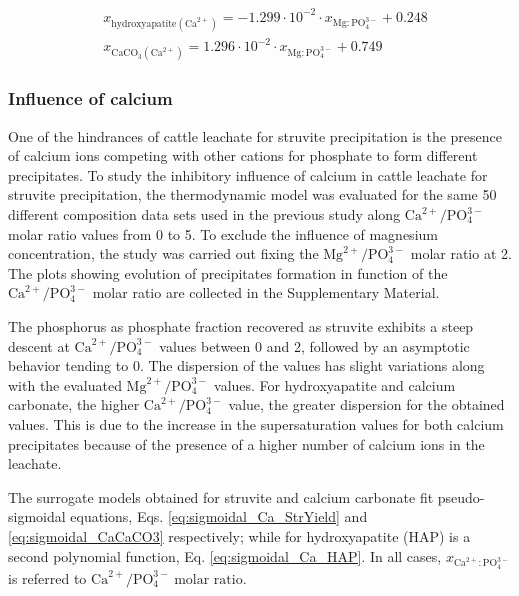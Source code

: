 \documentclass[10pt,a4paper]{article}
\begin{document}
\begin{align}
& x_{\text{hydroxyapatite} \left(\text{Ca}^{2+}\right)} = -1.299 \cdot 10^{-2} \cdot x_{\text{Mg}:\text{PO}_{4}^{3-}} + 0.248 \label{eq:1poly_Mg_CaCO3}\\
& x_{\text{CaCO}_{3} \left(\text{Ca}^{2+}\right)} = 1.296 \cdot 10^{-2} \cdot x_{\text{Mg}:\text{PO}_{4}^{3-}} + 0.749 \label{eq:1poly_Mg_HAP} 
\end{align}

\subsubsection{Influence of calcium}
One of the hindrances of cattle leachate for struvite precipitation is the presence of calcium ions competing with other cations for phosphate to form different precipitates.
To study the inhibitory influence of calcium in cattle leachate for struvite precipitation, the thermodynamic model was evaluated for the same 50 different composition data sets used in the previous study along $\text{Ca}^{2+}/\text{PO}_{4}^{3-}$ molar ratio values from 0 to 5. To exclude the influence of magnesium concentration, the study was carried out fixing the $\text{Mg}^{2+}/\text{PO}_{4}^{3-}$ molar ratio at 2.
The plots showing evolution of precipitates formation in function of the $\text{Ca}^{2+}/\text{PO}_{4}^{3-}$ molar ratio are collected in the Supplementary Material. 

The phosphorus as phosphate fraction recovered as struvite exhibits a steep descent at $\text{Ca}^{2+}/\text{PO}_{4}^{3-}$ values between 0 and 2, followed by an asymptotic behavior tending to 0. The dispersion of the values has slight variations along with the evaluated $\text{Mg}^{2+}/\text{PO}_{4}^{3-}$ values.
For hydroxyapatite and calcium carbonate, the higher $\text{Ca}^{2+}/\text{PO}_{4}^{3-}$ value, the greater dispersion for the obtained values. This is due to the increase in the supersaturation values for both calcium precipitates because of the presence of a higher number of calcium ions in the leachate.

The surrogate models obtained for struvite and calcium carbonate fit pseudo-sigmoidal equations, Eqs. \ref{eq:sigmoidal_Ca_StrYield} and \ref{eq:sigmoidal_CaCaCO3} respectively; while for hydroxyapatite (HAP) is a second polynomial function, Eq. \ref{eq:sigmoidal_Ca_HAP}. In all cases, $ x_{\text{Ca}^{2+}:\text{PO}_{4}^{3-}}$ is referred to $\text{Ca}^{2+}/\text{PO}_{4}^{3-} \ \text{molar ratio}$.
\end{document}

